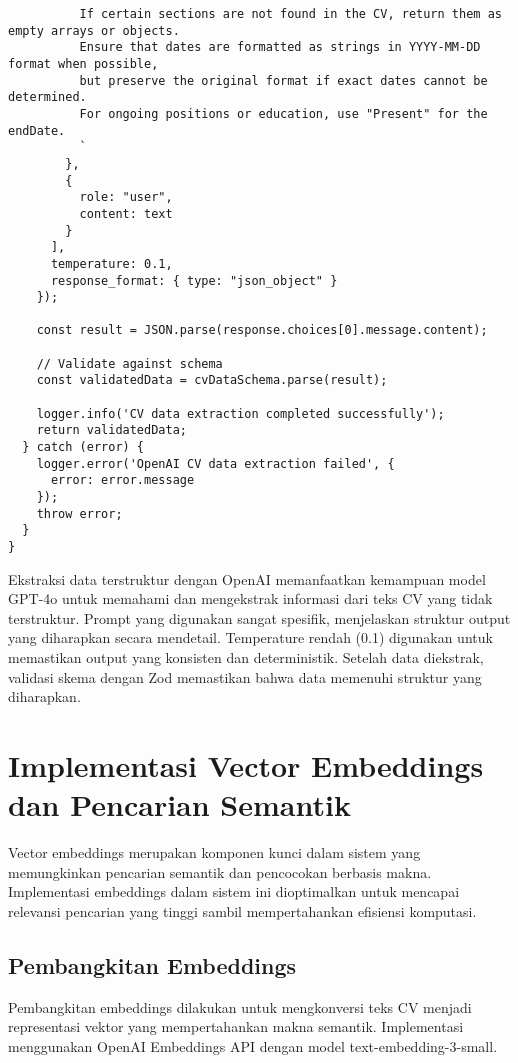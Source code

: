 \begin{verbatim}
          If certain sections are not found in the CV, return them as empty arrays or objects.
          Ensure that dates are formatted as strings in YYYY-MM-DD format when possible,
          but preserve the original format if exact dates cannot be determined.
          For ongoing positions or education, use "Present" for the endDate.
          `
        },
        {
          role: "user",
          content: text
        }
      ],
      temperature: 0.1,
      response_format: { type: "json_object" }
    });
    
    const result = JSON.parse(response.choices[0].message.content);
    
    // Validate against schema
    const validatedData = cvDataSchema.parse(result);
    
    logger.info('CV data extraction completed successfully');
    return validatedData;
  } catch (error) {
    logger.error('OpenAI CV data extraction failed', { 
      error: error.message 
    });
    throw error;
  }
}
\end{verbatim}

Ekstraksi data terstruktur dengan OpenAI memanfaatkan kemampuan model GPT-4o untuk memahami dan mengekstrak informasi dari teks CV yang tidak terstruktur. Prompt yang digunakan sangat spesifik, menjelaskan struktur output yang diharapkan secara mendetail. Temperature rendah (0.1) digunakan untuk memastikan output yang konsisten dan deterministik. Setelah data diekstrak, validasi skema dengan Zod memastikan bahwa data memenuhi struktur yang diharapkan.

\section{Implementasi Vector Embeddings dan Pencarian Semantik}
Vector embeddings merupakan komponen kunci dalam sistem yang memungkinkan pencarian semantik dan pencocokan berbasis makna. Implementasi embeddings dalam sistem ini dioptimalkan untuk mencapai relevansi pencarian yang tinggi sambil mempertahankan efisiensi komputasi.

\subsection{Pembangkitan Embeddings}
Pembangkitan embeddings dilakukan untuk mengkonversi teks CV menjadi representasi vektor yang mempertahankan makna semantik. Implementasi menggunakan OpenAI Embeddings API dengan model text-embedding-3-small.

